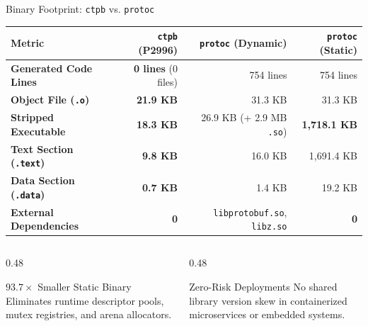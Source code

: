 \documentclass[aspectratio=169,10pt]{beamer}
\begin{document}
\begin{frame}{Binary Footprint: \texttt{ctpb} vs. \texttt{protoc}}
  \begin{table}[ht]
    \centering
    \scriptsize
    \renewcommand{\arraystretch}{1.2}
    \begin{tabular}{lrrr}
      \toprule
      \textbf{Metric} & \textbf{\texttt{ctpb} (P2996)} & \textbf{\texttt{protoc} (Dynamic)} & \textbf{\texttt{protoc} (Static)} \\
      \midrule
      \textbf{Generated Code Lines} & \textbf{0 lines} (0 files) & 754 lines & 754 lines \\
      \textbf{Object File (\texttt{.o})} & \textbf{21.9 KB} & 31.3 KB & 31.3 KB \\
      \textbf{Stripped Executable} & \textbf{18.3 KB} & 26.9 KB (+ 2.9 MB \texttt{.so}) & \textbf{1,718.1 KB} \\
      \textbf{Text Section (\texttt{.text})} & \textbf{9.8 KB} & 16.0 KB & 1,691.4 KB \\
      \textbf{Data Section (\texttt{.data})} & \textbf{0.7 KB} & 1.4 KB & 19.2 KB \\
      \textbf{External Dependencies} & \textbf{0} & \texttt{libprotobuf.so}, \texttt{libz.so} & \textbf{0} \\
      \bottomrule
    \end{tabular}
  \end{table}

  \begin{columns}[T]
    \begin{column}{0.48\textwidth}
      \begin{block}{$93.7\times$ Smaller Static Binary}
        Eliminates runtime descriptor pools, mutex registries, and arena allocators.
      \end{block}
    \end{column}
    \begin{column}{0.48\textwidth}
      \begin{block}{Zero-Risk Deployments}
        No shared library version skew in containerized microservices or embedded systems.
      \end{block}
    \end{column}
  \end{columns}
\end{frame}
\end{document}
